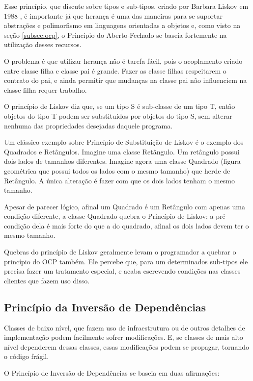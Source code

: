 Esse princípio, que discute sobre tipos e sub-tipos, criado por Barbara Liskov
em 1988 \cite{liskov}, é importante já que herança é uma das maneiras para se 
suportar abstrações e polimorfismo em linguagens orientadas a objetos e, como 
visto na seção \ref{subsec:ocp}, o Princípio do Aberto-Fechado se baseia 
fortemente na utilização desses recursos.

O problema é que utilizar herança não é tarefa fácil, pois o acoplamento criado
entre classe filha e classe pai é grande. Fazer as classe filhas respeitarem o
contrato do pai, e ainda permitir que mudanças na classe pai não influenciem na
classe filha requer trabalho.

O princípio de Liskov diz que, se um tipo S é sub-classe de um tipo T,
então objetos do tipo T podem ser substituídos por objetos do tipo S, sem
alterar nenhuma das propriedades desejadas daquele programa.

Um clássico exemplo sobre Princípio de Substituição de Liskov é o exemplo dos
Quadrados e Retângulos. Imagine uma classe Retângulo. Um retângulo possui dois 
lados de tamanhos diferentes. Imagine agora uma classe Quadrado (figura
geométrica que possui todos os lados com o mesmo tamanho) que herde de
Retângulo. A única alteração é fazer com que os dois lados tenham o mesmo 
tamanho. 

Apesar de parecer lógico, afinal um Quadrado é um Retângulo com apenas uma
condição diferente, a classe Quadrado quebra o Princípio de Liskov: a
pré-condição dela é mais forte do que a do quadrado, afinal os dois lados devem 
ter o mesmo tamanho.

Quebras do princípio de Liskov geralmente levam o programador a quebrar o
princípio do OCP também. Ele percebe que, para um determinados sub-tipos ele 
precisa fazer um tratamento especial, e acaba escrevendo condições nas classes 
clientes que fazem uso disso.

\subsection{Princípio da Inversão de Dependências}
\label{subsec:dip}

Classes de baixo nível, que fazem uso de infraestrutura ou de outros detalhes
de implementação podem facilmente sofrer modificações. E, se classes de mais alto
nível dependerem dessas classes, essas modificações podem se propagar, tornando
o código frágil.

O Princípio de Inversão de Dependências se baseia em duas afirmações:

